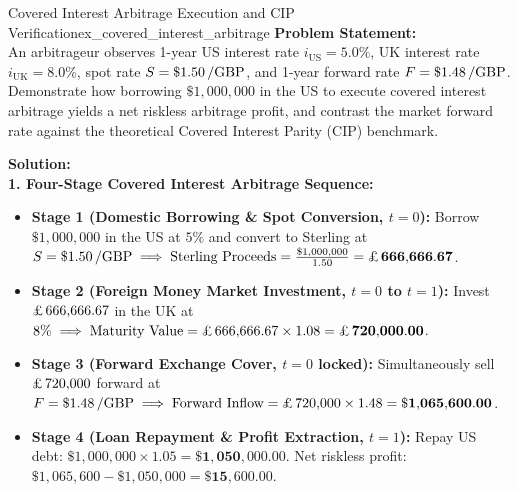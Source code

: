 \clearpage
\begin{example}{Covered Interest Arbitrage Execution and CIP Verification}{ex_covered_interest_arbitrage}
\textbf{Problem Statement:}\\
An arbitrageur observes 1-year US interest rate $i_{\text{US}} = 5.0\%$, UK interest rate $i_{\text{UK}} = 8.0\%$, spot rate $\Spot = \$1.50\,/\text{GBP}$, and 1-year forward rate $\Forward = \$1.48\,/\text{GBP}$. Demonstrate how borrowing $\$1{,}000{,}000$ in the US to execute covered interest arbitrage yields a net riskless arbitrage profit, and contrast the market forward rate against the theoretical Covered Interest Parity (CIP) benchmark.

\tcblower
\textbf{Solution:}\\
\noindent\textbf{1. Four-Stage Covered Interest Arbitrage Sequence:}
\begin{itemize}[leftmargin=*, itemsep=1.5pt, topsep=1.5pt]
    \item \textbf{Stage 1 (Domestic Borrowing \& Spot Conversion, $t=0$):} Borrow $\$1{,}000{,}000$ in the US at $5\%$ and convert to Sterling at $\Spot = \$1.50\,/\text{GBP} \implies \text{Sterling Proceeds} = \frac{\$1{,}000{,}000}{1.50} = \mathbf{\gbp 666{,}666.67}$.
    \item \textbf{Stage 2 (Foreign Money Market Investment, $t=0$ to $t=1$):} Invest $\gbp 666{,}666.67$ in the UK at $8\% \implies \text{Maturity Value} = \gbp 666{,}666.67 \times 1.08 = \mathbf{\gbp 720{,}000.00}$.
    \item \textbf{Stage 3 (Forward Exchange Cover, $t=0$ locked):} Simultaneously sell $\gbp 720{,}000$ forward at $\Forward = \$1.48\,/\text{GBP} \implies \text{Forward Inflow} = \gbp 720{,}000 \times 1.48 = \mathbf{\$1{,}065{,}600.00}$.
    \item \textbf{Stage 4 (Loan Repayment \& Profit Extraction, $t=1$):} Repay US debt: $\$1{,}000{,}000 \times 1.05 = \mathbf{\$1{,}050{,}000.00}$. Net riskless profit: $\$1{,}065{,}600 - \$1{,}050{,}000 = \mathbf{\$15{,}600.00}$.
\end{itemize}


\end{example}
